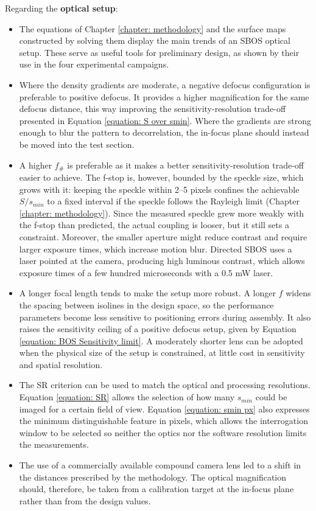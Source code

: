 Regarding the \textbf{optical setup}:

\begin{itemize}
    \item The equations of Chapter \ref{chapter: methodology} and the surface maps constructed by solving them display the main trends of an SBOS optical setup. These serve as useful tools for preliminary design, as shown by their use in the four experimental campaigns.

    \item Where the density gradients are moderate, a negative defocus configuration is preferable to positive defocus. It provides a higher magnification for the same defocus distance, this way improving the sensitivity-resolution trade-off presented in Equation \ref{equation: S over smin}. Where the gradients are strong enough to blur the pattern to decorrelation, the in-focus plane should instead be moved into the test section.

    \item A higher $f_\#$ is preferable as it makes a better sensitivity-resolution trade-off easier to achieve. The f-stop is, however, bounded by the speckle size, which grows with it: keeping the speckle within 2--5 pixels confines the achievable $S/s_{min}$ to a fixed interval if the speckle follows the Rayleigh limit (Chapter \ref{chapter: methodology}). Since the measured speckle grew more weakly with the f-stop than predicted, the actual coupling is looser, but it still sets a constraint. Moreover, the smaller aperture might reduce contrast and require larger exposure times, which increase motion blur. Directed SBOS uses a laser pointed at the camera, producing high luminous contrast, which allows exposure times of a few hundred microseconds with a 0.5 mW laser.

    \item A longer focal length tends to make the setup more robust. A longer $f$ widens the spacing between isolines in the design space, so the performance parameters become less sensitive to positioning errors during assembly. It also raises the sensitivity ceiling of a positive defocus setup, given by Equation \ref{equation: BOS Sensitivity limit}. A moderately shorter lens can be adopted when the physical size of the setup is constrained, at little cost in sensitivity and spatial resolution.

    \item The SR criterion can be used to match the optical and processing resolutions. Equation \ref{equation: SR} allows the selection of how many $s_{min}$ could be imaged for a certain field of view. Equation \ref{equation: smin px} also expresses the minimum distinguishable feature in pixels, which allows the interrogation window to be selected so neither the optics nor the software resolution limits the measurements.

    \item The use of a commercially available compound camera lens led to a shift in the distances prescribed by the methodology. The optical magnification should, therefore, be taken from a calibration target at the in-focus plane rather than from the design values.
\end{itemize}

